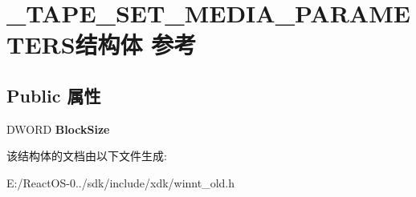 \hypertarget{struct___t_a_p_e___s_e_t___m_e_d_i_a___p_a_r_a_m_e_t_e_r_s}{}\section{\+\_\+\+T\+A\+P\+E\+\_\+\+S\+E\+T\+\_\+\+M\+E\+D\+I\+A\+\_\+\+P\+A\+R\+A\+M\+E\+T\+E\+R\+S结构体 参考}
\label{struct___t_a_p_e___s_e_t___m_e_d_i_a___p_a_r_a_m_e_t_e_r_s}
\subsection*{Public 属性}
\begin{DoxyCompactItemize}
\item 
\mbox{\label{struct___t_a_p_e___s_e_t___m_e_d_i_a___p_a_r_a_m_e_t_e_r_s_a2032011d60a8613bda8e477fc3728036}} 
D\+W\+O\+RD {\bfseries Block\+Size}
\end{DoxyCompactItemize}


该结构体的文档由以下文件生成\+:\begin{DoxyCompactItemize}
\item 
E\+:/\+React\+O\+S-\/0../sdk/include/xdk/winnt\+\_\+old.\+h\end{DoxyCompactItemize}
